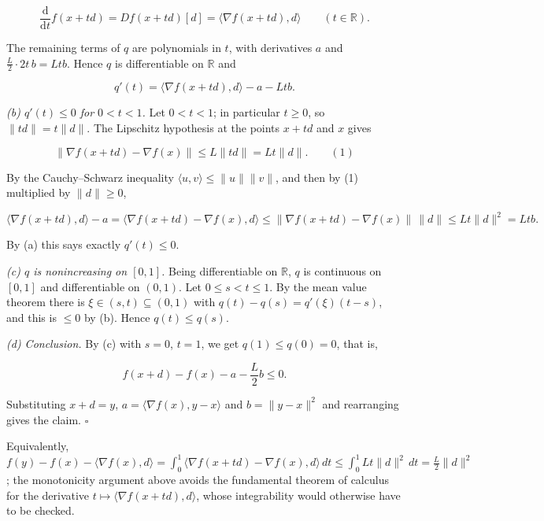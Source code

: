 \documentclass[11pt,a4paper]{article}
\begin{document}
\[\frac{\mathrm d}{\mathrm dt}f(x+td)=Df(x+td)[d]=\langle\nabla f(x+td),d\rangle\qquad(t\in\mathbb R).\]


The remaining terms of \(q\) are polynomials in \(t\), with derivatives \(a\) and \(\frac L2\cdot2t\,b=Ltb\). Hence \(q\) is differentiable on \(\mathbb R\) and


\[q'(t)=\langle\nabla f(x+td),d\rangle-a-Ltb.\]


\emph{(b) \(q'(t)\le0\) for \(0<t<1\).} Let \(0<t<1\); in particular \(t\ge0\), so \(\|td\|=t\|d\|\). The Lipschitz hypothesis at the points \(x+td\) and \(x\) gives


\[\|\nabla f(x+td)-\nabla f(x)\|\le L\|td\|=Lt\|d\|.\qquad(1)\]


By the Cauchy–Schwarz inequality \(\langle u,v\rangle\le\|u\|\|v\|\), and then by (1) multiplied by \(\|d\|\ge0\),


\[\langle\nabla f(x+td),d\rangle-a=\langle\nabla f(x+td)-\nabla f(x),d\rangle\le\|\nabla f(x+td)-\nabla f(x)\|\,\|d\|\le Lt\|d\|^2=Ltb.\]


By (a) this says exactly \(q'(t)\le0\).




\emph{(c) \(q\) is nonincreasing on \([0,1]\).} Being differentiable on \(\mathbb R\), \(q\) is continuous on \([0,1]\) and differentiable on \((0,1)\). Let \(0\le s<t\le1\). By the mean value theorem there is \(\xi\in(s,t)\subseteq(0,1)\) with \(q(t)-q(s)=q'(\xi)(t-s)\), and this is \(\le0\) by (b). Hence \(q(t)\le q(s)\).




\emph{(d) Conclusion.} By (c) with \(s=0\), \(t=1\), we get \(q(1)\le q(0)=0\), that is,


\[f(x+d)-f(x)-a-\frac L2b\le0.\]


Substituting \(x+d=y\), \(a=\langle\nabla f(x),y-x\rangle\) and \(b=\|y-x\|^2\) and rearranging gives the claim. \(\square\)




Equivalently, \(f(y)-f(x)-\langle\nabla f(x),d\rangle=\int_0^1\langle\nabla f(x+td)-\nabla f(x),d\rangle\,dt\le\int_0^1Lt\|d\|^2\,dt=\frac L2\|d\|^2\); the monotonicity argument above avoids the fundamental theorem of calculus for the derivative \(t\mapsto\langle\nabla f(x+td),d\rangle\), whose integrability would otherwise have to be checked.
\end{document}
